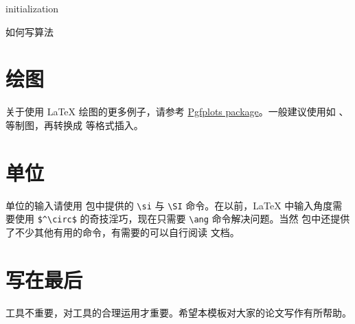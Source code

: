 \begin{algorithm}
  \SetAlgoLined
    initialization\;
  \caption{如何写算法}\label{alg:alg1}
\end{algorithm}

\section{绘图}
关于使用 \LaTeX{} 绘图的更多例子，请参考 \href{https://www.overleaf.com/learn/latex/Pgfplots_package}{Pgfplots package}。一般建议使用如 、 等制图，再转换成  等格式插入。

\section{单位}
单位的输入请使用  包中提供的 \verb|\si| 与 \verb|\SI| 命令。在以前，\LaTeX{} 中输入角度需要使用 \verb|$^\circ$| 的奇技淫巧，现在只需要 \verb|\ang| 命令解决问题。当然  包中还提供了不少其他有用的命令，有需要的可以自行阅读  文档。


\section{写在最后}
工具不重要，对工具的合理运用才重要。希望本模板对大家的论文写作有所帮助。
